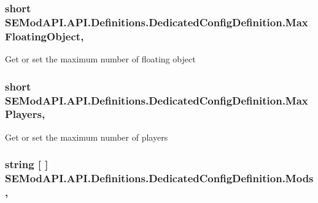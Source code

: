 \subsubsection[{Max\+Floating\+Object}]{\setlength{\rightskip}{0pt plus 5cm}short S\+E\+Mod\+A\+P\+I.\+A\+P\+I.\+Definitions.\+Dedicated\+Config\+Definition.\+Max\+Floating\+Object\hspace{0.3cm}{\ttfamily [get]}, {\ttfamily [set]}}\label{class_s_e_mod_a_p_i_1_1_a_p_i_1_1_definitions_1_1_dedicated_config_definition_af39dad2555eedb600898ea168980ba3c}


Get or set the maximum number of floating object 

\hypertarget{class_s_e_mod_a_p_i_1_1_a_p_i_1_1_definitions_1_1_dedicated_config_definition_a4b5950d6f187ff7ec9f1482cf81f35c9}{}
\subsubsection[{Max\+Players}]{\setlength{\rightskip}{0pt plus 5cm}short S\+E\+Mod\+A\+P\+I.\+A\+P\+I.\+Definitions.\+Dedicated\+Config\+Definition.\+Max\+Players\hspace{0.3cm}{\ttfamily [get]}, {\ttfamily [set]}}\label{class_s_e_mod_a_p_i_1_1_a_p_i_1_1_definitions_1_1_dedicated_config_definition_a4b5950d6f187ff7ec9f1482cf81f35c9}


Get or set the maximum number of players 

\hypertarget{class_s_e_mod_a_p_i_1_1_a_p_i_1_1_definitions_1_1_dedicated_config_definition_a227e7b6668d1e6d8d97f5c59c9535c39}{}
\subsubsection[{Mods}]{\setlength{\rightskip}{0pt plus 5cm}string \mbox{[} \mbox{]} S\+E\+Mod\+A\+P\+I.\+A\+P\+I.\+Definitions.\+Dedicated\+Config\+Definition.\+Mods\hspace{0.3cm}{\ttfamily [get]}, {\ttfamily [set]}}\label{class_s_e_mod_a_p_i_1_1_a_p_i_1_1_definitions_1_1_dedicated_config_definition_a227e7b6668d1e6d8d97f5c59c9535c39}


